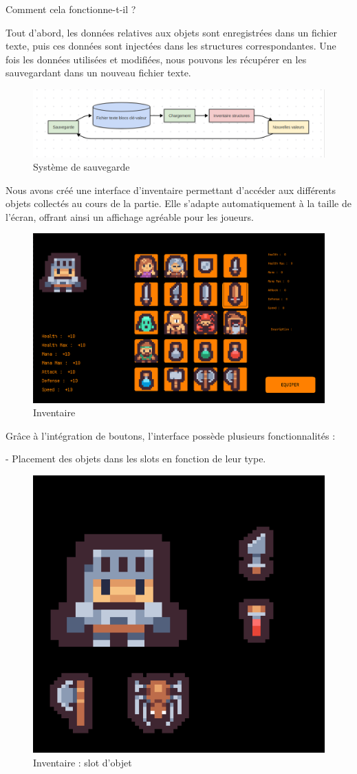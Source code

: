 \documentclass[a4paper,11pt]{article}
\begin{document}
\begin{center} 
Comment cela fonctionne-t-il ? 
\end{center} Tout d'abord, les données relatives aux objets sont enregistrées dans un fichier texte, puis ces données sont injectées dans les structures correspondantes. Une fois les données utilisées et modifiées, nous pouvons les récupérer en les sauvegardant dans un nouveau fichier texte.

\begin{figure}[ht]
    \centering 
    \includegraphics[width=1\linewidth]{./img/systemeSauvegarde.png} 
    \caption{Système de sauvegarde} 
    \label{fig:sauvegarde} 
\end{figure}
 
Nous avons créé une interface d'inventaire permettant d'accéder aux différents objets collectés au cours de la partie. Elle s'adapte automatiquement à la taille de l'écran, offrant ainsi un affichage agréable pour les joueurs.

\begin{figure}[ht] 
    \centering 
    \includegraphics[width=0.4\linewidth]{./img/inventaire.png} 
    \caption{Inventaire} 
\end{figure} Grâce à l'intégration de boutons, l'interface possède plusieurs fonctionnalités :

   - Placement des objets dans les slots en fonction de leur type.

\begin{figure}[ht]
    \centering 
    \includegraphics[width=0.2\linewidth]{./img/itemslot.png} 
    \caption{Inventaire : slot d'objet} 
\end{figure}
\end{document}
